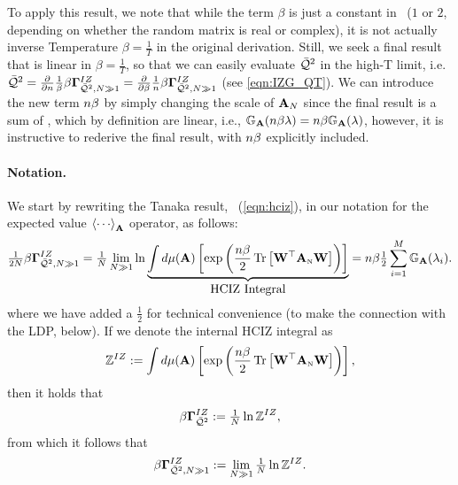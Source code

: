 To apply this result, we note that
while the term $\beta$ is just a constant in~\cite{Tanaka2008}
($1$ or $2$, depending on whether the random matrix is real or complex),
it is not actually inverse Temperature $\beta=\tfrac{1}{T}$ in the original derivation.
Still, we seek a final result that is linear in $\beta=\tfrac{1}{T}$,
so that we can easily evaluate $\bar{\mathcal{Q}}^{2}$ in the high-T limit, i.e.
$\bar{\mathcal{Q}}^{2}
=\tfrac{\partial}{\partial n}\tfrac{1}{\beta}\beta\mathbf{\Gamma}^{IZ}_{\bar{\mathcal{Q}}^{2},N\gg 1}
=\tfrac{\partial}{\partial \beta}\tfrac{1}{n}\beta\mathbf{\Gamma}^{IZ}_{\bar{\mathcal{Q}}^{2},N\gg 1}$
(see \ref{eqn:IZG_QT}).
We can introduce the new term $n\beta$ by
simply changing the scale of $\mathbf{A}_N$ since the final result is a sum of \RTransforms, which by definition
are linear, i.e., $\mathbb{G}_{\mathbf{A}}(n\beta\lambda)=n\beta \mathbb{G}_{\mathbf{A}}(\lambda)$, however, it is instructive
to rederive the final result, with $n\beta$ explicitly included.


\paragraph{Notation.}

We start by rewriting the Tanaka result, \EQN~(\ref{eqn:hciz}),
in our notation for the expected value $\Expected[\AMAT]{\cdots}$ operator, as follows:
\begin{equation}
\label{eqn:hciz2}
  \tfrac{1}{2N}\beta\mathbf{\Gamma}^{IZ}_{\bar{\mathcal{Q}}^{2},N\gg 1} = 
  \tfrac{1}{N}\lim_{N\gg 1} \ln \underbrace{ \int d\mu(\mathbf{\mathbf{A}})\left[\exp\left(\frac{n\beta}{2}\mbox{}\operatorname{Tr}\left[\mathbf{W}^{\top}{\mathbf{A}}_{\text{\tiny N}}\mathbf{W}\right]\right)\right] }_{\mbox{HCIZ Integral}} 
  = n\beta \tfrac{1}{2}\sum_{i=1}^{M}\mathbb{G}_{\mathbf{A}}(\lambda_{i})   .
\end{equation}
where we have added a $\tfrac{1}{2}$ for technical convenience (to make the connection with the LDP, below).
If we denote the internal HCIZ integral as 
\begin{equation}
\label{eqn:hciz_def}
  \mathbb{Z}^{IZ} := \int d\mu(\mathbf{\mathbf{A}})\left[\exp\left(\frac{n\beta}{2}\mbox{}\operatorname{Tr}\left[\mathbf{W}^{\top}{\mathbf{A}}_{\text{\tiny N}}\mathbf{W}\right]\right)\right]  ,
 \end{equation}
then it holds that 
\begin{equation}
  \label{eqn:hciz_def2}
  \beta\mathbf{\Gamma}^{IZ}_{\bar{\mathcal{Q}}^{2}} := \tfrac{1}{N}\ln\mathbb{Z}^{IZ}  ,
\end{equation}
from which it follows that %
\begin{equation}
\label{eqn:hciz_def3}
  \beta\mathbf{\Gamma}^{IZ}_{\bar{\mathcal{Q}}^{2},N\gg 1} := \lim_{N \gg 1}\tfrac{1}{N}\ln\mathbb{Z}^{IZ}  .
\end{equation}

